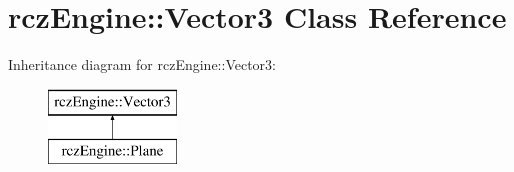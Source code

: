 \hypertarget{classrcz_engine_1_1_vector3}{}\section{rcz\+Engine\+:\+:Vector3 Class Reference}
\label{classrcz_engine_1_1_vector3}
Inheritance diagram for rcz\+Engine\+:\+:Vector3\+:\begin{figure}[H]
\begin{center}
\leavevmode
\includegraphics[height=2.000000cm]{classrcz_engine_1_1_vector3}
\end{center}
\end{figure}
